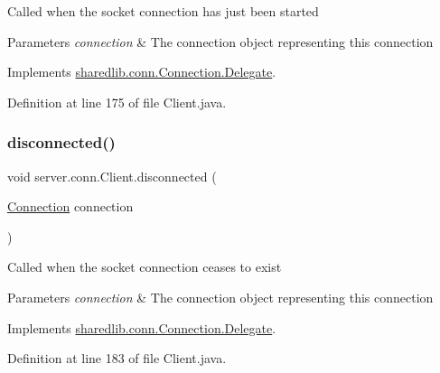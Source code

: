 Called when the socket connection has just been started


\begin{DoxyParams}{Parameters}
{\em connection} & The connection object representing this connection \\
\hline
\end{DoxyParams}


Implements \hyperlink{interfacesharedlib_1_1conn_1_1_connection_1_1_delegate_acb701b2d46601fd448eba6c79b82694d}{sharedlib.\+conn.\+Connection.\+Delegate}.



Definition at line 175 of file Client.\+java.

\hypertarget{classserver_1_1conn_1_1_client_aa31a10ee47f357ef36983e456c5e9f8e}{}\label{classserver_1_1conn_1_1_client_aa31a10ee47f357ef36983e456c5e9f8e} 
\subsubsection{\texorpdfstring{disconnected()}{disconnected()}}
{\footnotesize\ttfamily void server.\+conn.\+Client.\+disconnected (\begin{DoxyParamCaption}\item[{\hyperlink{classsharedlib_1_1conn_1_1_connection}{Connection}}]{connection }\end{DoxyParamCaption})}

Called when the socket connection ceases to exist


\begin{DoxyParams}{Parameters}
{\em connection} & The connection object representing this connection \\
\hline
\end{DoxyParams}


Implements \hyperlink{interfacesharedlib_1_1conn_1_1_connection_1_1_delegate_a64e49ea25180c770c2cbc1953fd79fed}{sharedlib.\+conn.\+Connection.\+Delegate}.



Definition at line 183 of file Client.\+java.

\hypertarget{classserver_1_1conn_1_1_client_a6310d31662f51012c9e6e0aa28d43528}{}\label{classserver_1_1conn_1_1_client_a6310d31662f51012c9e6e0aa28d43528} 
